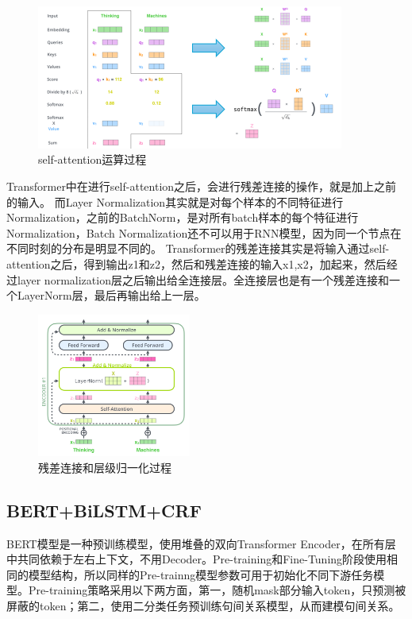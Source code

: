 \documentclass[a4paper, 12pt]{article}
\begin{document}
\begin{figure}[htbp]
    \centering
    \includegraphics[width=0.9\textwidth]{cal_process}
    \caption{self-attention运算过程}
    \label{fig:encoder}
\end{figure}

Transformer中在进行self-attention之后，会进行残差连接的操作，就是加上之前的输入。
而Layer Normalization其实就是对每个样本的不同特征进行Normalization，之前的BatchNorm，是对所有batch样本的每个特征进行Normalization，Batch Normalization还不可以用于RNN模型，因为同一个节点在不同时刻的分布是明显不同的。
Transformer的残差连接其实是将输入通过self-attention之后，得到输出z1和z2，然后和残差连接的输入x1,x2，加起来，然后经过layer normalization层之后输出给全连接层。全连接层也是有一个残差连接和一个LayerNorm层，最后再输出给上一层。

\begin{figure}[htbp]
    \centering
    \includegraphics[width=0.45\textwidth]{layer_norm}
    \caption{残差连接和层级归一化过程}
    \label{fig:encoder}
\end{figure}


\subsection{BERT+BiLSTM+CRF} %
\label{sub:bert}

BERT\cite{devlin2018pretraining}模型是一种预训练模型，使用堆叠的双向Transformer Encoder，在所有层中共同依赖于左右上下文，不用Decoder。Pre-training和Fine-Tuning阶段使用相同的模型结构，所以同样的Pre-trainng模型参数可用于初始化不同下游任务模型。Pre-training策略采用以下两方面，第一，随机mask部分输入token，只预测被屏蔽的token；第二，使用二分类任务预训练句间关系模型，从而建模句间关系。
\end{document}
